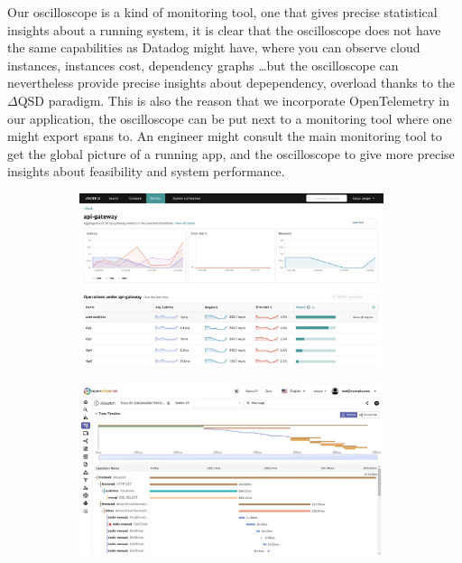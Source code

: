         Our oscilloscope is a kind of monitoring tool, one that gives precise statistical insights about a running system, it is clear that the oscilloscope does not have the same capabilities as Datadog \cite{datadog} might have, where you can observe cloud instances, instances cost, dependency graphs \dots but the oscilloscope can nevertheless provide precise insights about depependency, overload thanks to the $\Delta$QSD paradigm. This is also the reason that we incorporate OpenTelemetry in our application, the oscilloscope can be put next to a monitoring tool where one might export spans to. An engineer might consult the main monitoring tool to get the global picture of a running app, and the oscilloscope to give more precise insights about feasibility and system performance.
       \begin{figure}[H]
            \centering
            \begin{subfigure}{.5\textwidth}
                \centering
                \includegraphics[width=0.98\textwidth]{img/jaeger.png}
                \label{fig:sub1}
            \end{subfigure}%
            \begin{subfigure}{.5\textwidth}
                \centering
                \includegraphics[width =0.98\textwidth]{img/jaeger2.jpg}
                \label{fig:sub2}
            \end{subfigure}
            \label{fig:test}
            \end{figure}

